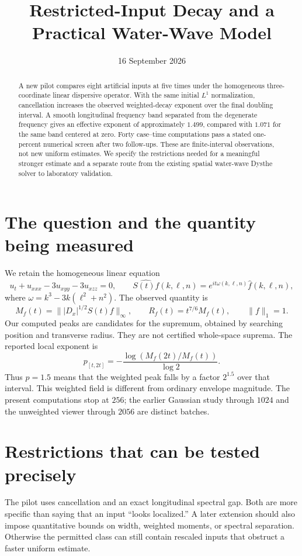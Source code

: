 \documentclass[10pt]{article}
\title{Restricted-Input Decay and a Practical Water-Wave Model}
\author{}
\date{16 September 2026}
\begin{document}
\maketitle
\begin{abstract}
A new pilot compares eight artificial inputs at five times under the homogeneous three-coordinate linear dispersive operator. With the same initial $L^1$ normalization, cancellation increases the observed weighted-decay exponent over the final doubling interval. A smooth longitudinal frequency band separated from the degenerate frequency gives an effective exponent of approximately $1.499$, compared with $1.071$ for the same band centered at zero. Forty case--time computations pass a stated one-percent numerical screen after two follow-ups. These are finite-interval observations, not new uniform estimates. We specify the restrictions needed for a meaningful stronger estimate and a separate route from the existing spatial water-wave Dysthe solver to laboratory validation.
\end{abstract}

\section{The question and the quantity being measured}
We retain the homogeneous linear equation
\[
 u_t+u_{xxx}-3u_{xyy}-3u_{xzz}=0,
 \qquad \widehat{S(t)f}(k,\ell,n)=e^{it\omega(k,\ell,n)}\widehat f(k,\ell,n),
\]
where $\omega=k^3-3k(\ell^2+n^2)$. The observed quantity is
\[
 M_f(t)=\big\||D_x|^{1/2}S(t)f\big\|_\infty,\qquad
 R_f(t)=t^{7/6}M_f(t),\qquad \|f\|_1=1.
\]
Our computed peaks are candidates for the supremum, obtained by searching position and transverse radius. They are not certified whole-space suprema. The reported local exponent is
\[
 p_{[t,2t]}=-\frac{\log(M_f(2t)/M_f(t))}{\log 2}.
\]
Thus $p=1.5$ means that the weighted peak falls by a factor $2^{1.5}$ over that interval. This weighted field is different from ordinary envelope magnitude. The present computations stop at $256$; the earlier Gaussian study through $1024$ and the unweighted viewer through $2056$ are distinct batches.

\section{Restrictions that can be tested precisely}
The pilot uses cancellation and an exact longitudinal spectral gap. Both are more specific than saying that an input ``looks localized.'' A later extension should also impose quantitative bounds on width, weighted moments, or spectral separation. Otherwise the permitted class can still contain rescaled inputs that obstruct a faster uniform estimate.
\end{document}
